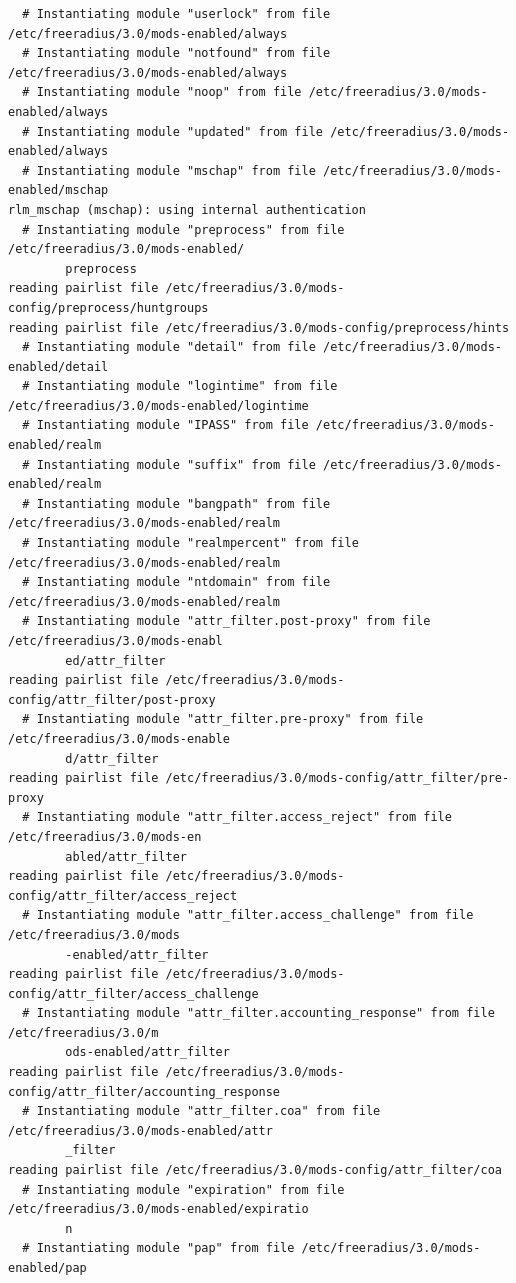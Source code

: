 \documentclass[11pt]{article}
\begin{document}
\begin{verbatim}
  # Instantiating module "userlock" from file /etc/freeradius/3.0/mods-enabled/always
  # Instantiating module "notfound" from file /etc/freeradius/3.0/mods-enabled/always
  # Instantiating module "noop" from file /etc/freeradius/3.0/mods-enabled/always
  # Instantiating module "updated" from file /etc/freeradius/3.0/mods-enabled/always
  # Instantiating module "mschap" from file /etc/freeradius/3.0/mods-enabled/mschap
rlm_mschap (mschap): using internal authentication
  # Instantiating module "preprocess" from file /etc/freeradius/3.0/mods-enabled/
        preprocess
reading pairlist file /etc/freeradius/3.0/mods-config/preprocess/huntgroups
reading pairlist file /etc/freeradius/3.0/mods-config/preprocess/hints
  # Instantiating module "detail" from file /etc/freeradius/3.0/mods-enabled/detail
  # Instantiating module "logintime" from file /etc/freeradius/3.0/mods-enabled/logintime
  # Instantiating module "IPASS" from file /etc/freeradius/3.0/mods-enabled/realm
  # Instantiating module "suffix" from file /etc/freeradius/3.0/mods-enabled/realm
  # Instantiating module "bangpath" from file /etc/freeradius/3.0/mods-enabled/realm
  # Instantiating module "realmpercent" from file /etc/freeradius/3.0/mods-enabled/realm
  # Instantiating module "ntdomain" from file /etc/freeradius/3.0/mods-enabled/realm
  # Instantiating module "attr_filter.post-proxy" from file /etc/freeradius/3.0/mods-enabl
        ed/attr_filter
reading pairlist file /etc/freeradius/3.0/mods-config/attr_filter/post-proxy
  # Instantiating module "attr_filter.pre-proxy" from file /etc/freeradius/3.0/mods-enable
        d/attr_filter
reading pairlist file /etc/freeradius/3.0/mods-config/attr_filter/pre-proxy
  # Instantiating module "attr_filter.access_reject" from file /etc/freeradius/3.0/mods-en
        abled/attr_filter
reading pairlist file /etc/freeradius/3.0/mods-config/attr_filter/access_reject
  # Instantiating module "attr_filter.access_challenge" from file /etc/freeradius/3.0/mods
        -enabled/attr_filter
reading pairlist file /etc/freeradius/3.0/mods-config/attr_filter/access_challenge
  # Instantiating module "attr_filter.accounting_response" from file /etc/freeradius/3.0/m
        ods-enabled/attr_filter
reading pairlist file /etc/freeradius/3.0/mods-config/attr_filter/accounting_response
  # Instantiating module "attr_filter.coa" from file /etc/freeradius/3.0/mods-enabled/attr
        _filter
reading pairlist file /etc/freeradius/3.0/mods-config/attr_filter/coa
  # Instantiating module "expiration" from file /etc/freeradius/3.0/mods-enabled/expiratio
        n
  # Instantiating module "pap" from file /etc/freeradius/3.0/mods-enabled/pap

\end{verbatim}
\end{document}
